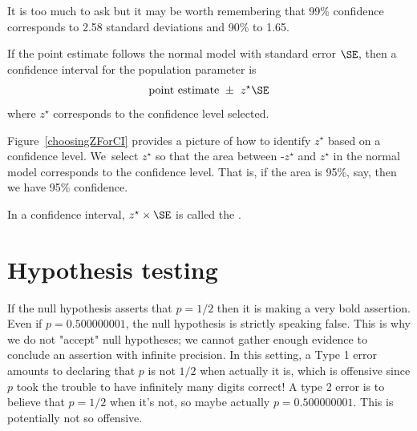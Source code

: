 It is too much to ask but it may be worth remembering that 99\% confidence corresponds to 2.58 standard deviations and 90\% to 1.65.


\begin{termBox}{
If the point estimate follows the normal model with standard error $\SE$, then a confidence interval for the population parameter is
\begin{eqnarray*}
\text{point estimate}\ \pm\ z^{\star} \SE
\end{eqnarray*}
where $z^{\star}$ corresponds to the confidence level selected.}
\end{termBox}

Figure~\ref{choosingZForCI} provides a picture of how to identify $z^{\star}$ based on a confidence level. We~select $z^{\star}$ so that the area between -$z^{\star}$ and $z^{\star}$ in the normal model corresponds to the confidence level. That is, if the area is 95\%, say, then we have 95\% confidence.

\begin{termBox}{
\label{marginOfErrorTermBox}In a confidence interval, $z^{\star}\times \SE$ is called the .}
\end{termBox}




\section{Hypothesis testing}
\label{hypothesisTesting}



If the null hypothesis asserts that $p=1/2$ then it is making a very bold assertion. Even if $p=0.500000001$, the null hypothesis is strictly speaking false. This is why we do not "accept" null hypotheses; we cannot gather enough evidence to conclude an assertion with infinite precision. In this setting, a Type 1 error amounts to declaring that $p$ is not $1/2$ when actually it is, which is offensive since $p$ took the trouble to have infinitely many digits correct! A type 2 error is to believe that $p=1/2$ when it's not, so maybe actually $p=0.500000001$. This is potentially not so offensive.

